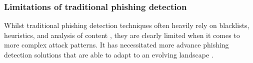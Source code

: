 
\subsubsection*{Limitations of traditional phishing detection}
Whilst traditional phishing detection techniques often heavily rely on blacklists, heuristics, and analysis of content \citep{sheng2009empirical}, they are clearly limited when it comes to more complex attack patterns. It has necessitated more advance phishing detection solutions that are able to adapt to an evolving landscape \citep{andriu2023adaptive}.
